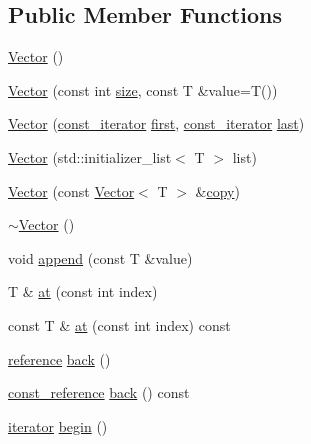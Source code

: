 \subsection*{Public Member Functions}
\begin{DoxyCompactItemize}
\item 
\hyperlink{classprism_1_1_vector_a0081b629c0ab4d85d6847a8cf382f1af}{Vector} ()
\item 
\hyperlink{classprism_1_1_vector_a61d37ac01e42fca59cdf320804a2a7ed}{Vector} (const int \hyperlink{classprism_1_1_vector_ac6ff3296683e76da61d48bcc15e4f175}{size}, const T \&value=T())
\item 
\hyperlink{classprism_1_1_vector_a32d0e9063ca7e7fb4ffed9940ee2b0bf}{Vector} (\hyperlink{classprism_1_1_vector_a4ae2d663b42920c426b768119bf9c770}{const\+\_\+iterator} \hyperlink{classprism_1_1_vector_a26ac035dfe5cf68c12c1435dff6f838d}{first}, \hyperlink{classprism_1_1_vector_a4ae2d663b42920c426b768119bf9c770}{const\+\_\+iterator} \hyperlink{classprism_1_1_vector_a89b03b8e2b66641c25f5014abb03dc03}{last})
\item 
\hyperlink{classprism_1_1_vector_a9a0d26456174aafd6bdae178f68dcd6d}{Vector} (std\+::initializer\+\_\+list$<$ T $>$ list)
\item 
\hyperlink{classprism_1_1_vector_a6df8c0a101ff496b688f4937ec1f13e6}{Vector} (const \hyperlink{classprism_1_1_vector}{Vector}$<$ T $>$ \&\hyperlink{namespaceprism_ae776f4cd825f79e7af1cf6ee1d90a209}{copy})
\item 
\hyperlink{classprism_1_1_vector_a80f2790bb6011dd40739bff844fd3154}{$\sim$\+Vector} ()
\item 
void \hyperlink{classprism_1_1_vector_a690b3be3b217aab2842a5b9b7b0ab4dd}{append} (const T \&value)
\item 
T \& \hyperlink{classprism_1_1_vector_a49ed82c4c3a5f73c9e6a8e0c3f86973a}{at} (const int index)
\item 
const T \& \hyperlink{classprism_1_1_vector_a7076c72b4887aa6759c0917b540a4ef3}{at} (const int index) const 
\item 
\hyperlink{classprism_1_1_vector_a8ccf98342707efbed82918a44be97438}{reference} \hyperlink{classprism_1_1_vector_ae629aba27dd49118bcd1af5bd7d2b600}{back} ()
\item 
\hyperlink{classprism_1_1_vector_a75325487acaa0f63496c110e5a5632bb}{const\+\_\+reference} \hyperlink{classprism_1_1_vector_a5e262cfa385b5df25ae821a2404ef2d7}{back} () const 
\item 
\hyperlink{classprism_1_1_vector_aec3211503bad8800731cc3e08170592e}{iterator} \hyperlink{classprism_1_1_vector_a89860cd9c113ac3f0a5f066604fcd528}{begin} ()

\end{DoxyCompactItemize}
